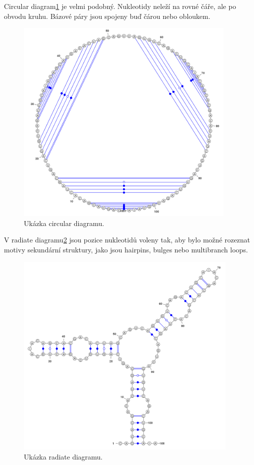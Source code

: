 Circular diagram\ref{circ} je velmi podobný. Nukleotidy neleží na rovné čáře, ale po
obvodu kruhu. Bázové páry jsou spojeny buď čárou nebo obloukem.

\begin{figure}[H]
  \centering
  \includegraphics[height=100mm]{../img/kap01/diagrams/circular.png}
  \caption[Ukázka circular diagramu]{Ukázka circular diagramu.}
  \label{circ}
\end{figure}

V radiate diagramu\ref{radiate} jsou pozice nukleotidů voleny tak, aby bylo možné rozeznat
motivy sekundární struktury, jako jsou hairpins, bulges nebo multibranch loops. 

\begin{figure}[H]
  \centering
  \includegraphics[height=100mm]{../img/kap01/diagrams/radiate.png}
  \caption[Ukázka radiate diagramu]{Ukázka radiate diagramu.}
  \label{radiate}
\end{figure}

